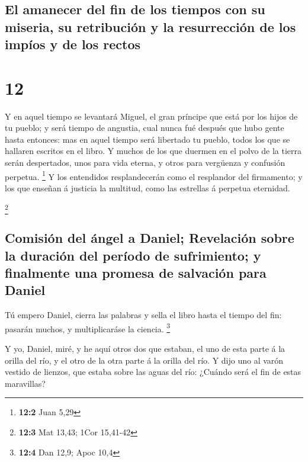 \hypertarget{el-amanecer-del-fin-de-los-tiempos-con-su-miseria-su-retribuciuxf3n-y-la-resurrecciuxf3n-de-los-impuxedos-y-de-los-rectos}{%
\subsection{El amanecer del fin de los tiempos con su miseria, su
retribución y la resurrección de los impíos y de los
rectos}\label{el-amanecer-del-fin-de-los-tiempos-con-su-miseria-su-retribuciuxf3n-y-la-resurrecciuxf3n-de-los-impuxedos-y-de-los-rectos}}

\hypertarget{section-11}{%
\section{12}\label{section-11}}

 Y en aquel tiempo se levantará Miguel, el gran príncipe que
está por los hijos de tu pueblo; y será tiempo de angustia, cual nunca
fué después que hubo gente hasta entonces: mas en aquel tiempo será
libertado tu pueblo, todos los que se hallaren escritos en el libro.
 Y muchos de los que duermen en el polvo de la tierra serán
despertados, unos para vida eterna, y otros para vergüenza y confusión
perpetua. \footnote{\textbf{12:2} Juan 5,29}  Y los
entendidos resplandecerán como el resplandor del firmamento; y los que
enseñan á justicia la multitud, como las estrellas á perpetua eternidad.

\footnote{\textbf{12:3} Mat 13,43; 1Cor 15,41-42}

\hypertarget{comisiuxf3n-del-uxe1ngel-a-daniel-revelaciuxf3n-sobre-la-duraciuxf3n-del-peruxedodo-de-sufrimiento-y-finalmente-una-promesa-de-salvaciuxf3n-para-daniel}{%
\subsection{Comisión del ángel a Daniel; Revelación sobre la duración
del período de sufrimiento; y finalmente una promesa de salvación para
Daniel}\label{comisiuxf3n-del-uxe1ngel-a-daniel-revelaciuxf3n-sobre-la-duraciuxf3n-del-peruxedodo-de-sufrimiento-y-finalmente-una-promesa-de-salvaciuxf3n-para-daniel}}

 Tú empero Daniel, cierra las palabras y sella el libro
hasta el tiempo del fin: pasarán muchos, y multiplicaráse la ciencia.
\footnote{\textbf{12:4} Dan 12,9; Apoc 10,4}

 Y yo, Daniel, miré, y he aquí otros dos que estaban, el uno
de esta parte á la orilla del río, y el otro de la otra parte á la
orilla del río.  Y dijo uno al varón vestido de lienzos, que
estaba sobre las aguas del río: ¿Cuándo será el fin de estas maravillas?

